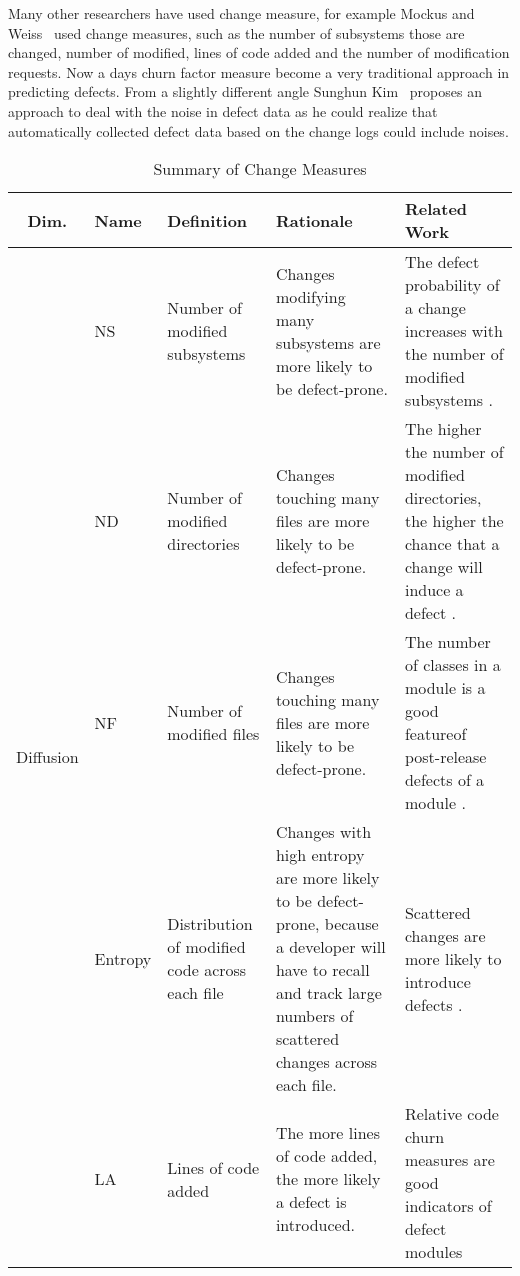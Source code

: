 \documentclass[10pt, conference]{IEEEtran}
\begin{document}
Many other researchers have used change measure, for example Mockus and Weiss~\cite{Mockus2000Bell} used change measures, such as the number of subsystems those are changed, number of modified, lines of code added and the number of modification requests. Now a days churn factor measure become a very traditional approach in predicting defects. From a slightly different angle Sunghun Kim~\cite{Kim2011ICSE} proposes an approach to deal with the noise in defect data as he could realize that automatically collected defect data based on the change logs could include noises.

\begin{table*}[t]
	\centering
	\caption{Summary of Change Measures}
	\begin{tabular}{|c|l|p{2.5cm}|p{5.5cm}|p{5.25cm}|}
		\hline Dim. & Name & Definition & Rationale & Related Work \\ 
		\hline \multirow{14}{*}{\begin{sideways}Diffusion\end{sideways}} & NS & Number of modified subsystems  & Changes modifying many subsystems are more likely to be defect-prone. & The defect probability of a change increases with the number of modified subsystems \cite{Mockus2000Bell}. \\ \cline{2-5}  
		& ND & Number of modified directories & Changes touching many files are more likely to be defect-prone. & The higher the number of modified directories, the higher the chance that a change will induce a defect \cite{Mockus2000Bell}. \\ \cline{2-5}  
		& NF & Number of modified files & Changes touching many files are more likely to be defect-prone. & The number of classes in a module is a good featureof post-release defects of a module \cite{Nagappan2006ICSE}. \\ \cline{2-5} 
		& Entropy & Distribution of modified code across each file & Changes with high entropy are more likely to be defect-prone, because a developer will have to recall and track large numbers of scattered changes across each file. & Scattered changes are more likely to introduce defects \cite{DAmbross2010MSR, Hassan2009ICSE}. \\ 
		\hline \multirow{4}{*}{\begin{sideways}Size\end{sideways}} & LA & Lines of code added & The more lines of code added, the more likely a defect is introduced. & \multirow{2}{5.25cm}{Relative code churn measures are good indicators of defect modules \cite{Moser2008ICSE, Nagappan2005ICSE}}. \\ \cline{2-4} 

\end{tabular}
\end{table*}
\end{document}
